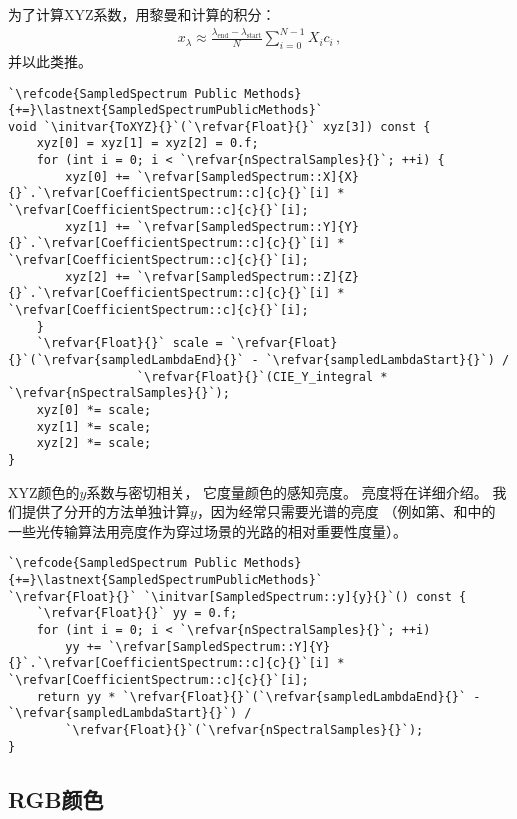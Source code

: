 为了计算XYZ系数，用黎曼和计算的积分：
\begin{align*}
    x_{\lambda}\approx\frac{\lambda_{\text{end}}-\lambda_{\text{start}}}{N}\sum\limits_{i=0}^{N-1}{X_ic_i}\, ,
\end{align*}
并以此类推。
\begin{lstlisting}
`\refcode{SampledSpectrum Public Methods}{+=}\lastnext{SampledSpectrumPublicMethods}`
void `\initvar{ToXYZ}{}`(`\refvar{Float}{}` xyz[3]) const {
    xyz[0] = xyz[1] = xyz[2] = 0.f;
    for (int i = 0; i < `\refvar{nSpectralSamples}{}`; ++i) {
        xyz[0] += `\refvar[SampledSpectrum::X]{X}{}`.`\refvar[CoefficientSpectrum::c]{c}{}`[i] * `\refvar[CoefficientSpectrum::c]{c}{}`[i];
        xyz[1] += `\refvar[SampledSpectrum::Y]{Y}{}`.`\refvar[CoefficientSpectrum::c]{c}{}`[i] * `\refvar[CoefficientSpectrum::c]{c}{}`[i];
        xyz[2] += `\refvar[SampledSpectrum::Z]{Z}{}`.`\refvar[CoefficientSpectrum::c]{c}{}`[i] * `\refvar[CoefficientSpectrum::c]{c}{}`[i];
    }
    `\refvar{Float}{}` scale = `\refvar{Float}{}`(`\refvar{sampledLambdaEnd}{}` - `\refvar{sampledLambdaStart}{}`) /
                  `\refvar{Float}{}`(CIE_Y_integral * `\refvar{nSpectralSamples}{}`);
    xyz[0] *= scale;
    xyz[1] *= scale;
    xyz[2] *= scale;
}
\end{lstlisting}

XYZ颜色的$y$系数与密切相关，
它度量颜色的感知亮度。
亮度将在详细介绍。
我们提供了分开的方法单独计算$y$，因为经常只需要光谱的亮度
（例如第、和中的
一些光传输算法用亮度作为穿过场景的光路的相对重要性度量）。
\begin{lstlisting}
`\refcode{SampledSpectrum Public Methods}{+=}\lastnext{SampledSpectrumPublicMethods}`
`\refvar{Float}{}` `\initvar[SampledSpectrum::y]{y}{}`() const {
    `\refvar{Float}{}` yy = 0.f;
    for (int i = 0; i < `\refvar{nSpectralSamples}{}`; ++i)
        yy += `\refvar[SampledSpectrum::Y]{Y}{}`.`\refvar[CoefficientSpectrum::c]{c}{}`[i] * `\refvar[CoefficientSpectrum::c]{c}{}`[i];
    return yy * `\refvar{Float}{}`(`\refvar{sampledLambdaEnd}{}` - `\refvar{sampledLambdaStart}{}`) /
        `\refvar{Float}{}`(`\refvar{nSpectralSamples}{}`);
}
\end{lstlisting}

\subsection{RGB颜色}\label{sub:RGB颜色}


